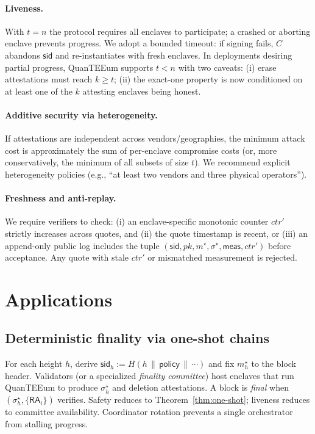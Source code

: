\documentclass[runningheads,orivec]{llncs}
\newcommand{\prot}{\textsf{QuanTEEum}}
\newcommand{\sid}{\mathsf{sid}}
\newcommand{\RA}{\mathsf{RA}}
\begin{document}
\paragraph{Liveness.}
With $t=n$ the protocol requires all enclaves to participate; a crashed or aborting enclave prevents progress. We adopt a bounded timeout: if signing fails, $C$ abandons $\sid$ and re-instantiates with fresh enclaves. In deployments desiring partial progress, \prot{} supports $t<n$ with two caveats: (i) erase attestations must reach $k\!\ge\!t$; (ii) the exact-one property is now conditioned on at least one of the $k$ attesting enclaves being honest.

\paragraph{Additive security via heterogeneity.}
If attestations are independent across vendors/geographies, the minimum attack cost is approximately the sum of per-enclave compromise costs (or, more conservatively, the minimum of all subsets of size $t$). We recommend explicit heterogeneity policies (e.g., “at least two vendors and three physical operators”).

\paragraph{Freshness and anti-replay.}
We require verifiers to check: (i) an enclave-specific monotonic counter $ctr'$ strictly increases across quotes, and (ii) the quote timestamp is recent, or (iii) an append-only public log includes the tuple $(\mathsf{sid},pk,m^{\star},\sigma^{\star},\mathsf{meas},ctr')$ before acceptance. Any quote with stale $ctr'$ or mismatched measurement is rejected.

\section{Applications}\label{sec:apps}
\subsection{Deterministic finality via one-shot chains}
For each height $h$, derive $\mathsf{sid}_h := H(h\,\|\,\textsf{policy}\,\|\,\cdots)$ and fix $m_h^{\star}$ to the block header. Validators (or a specialized \emph{finality committee}) host enclaves that run \prot{} to produce $\sigma_h^{\star}$ and deletion attestations. A block is \emph{final} when $(\sigma_h^{\star},\{\RA_i\})$ verifies. Safety reduces to Theorem~\ref{thm:one-shot}; liveness reduces to committee availability. Coordinator rotation prevents a single orchestrator from stalling progress.
\end{document}
